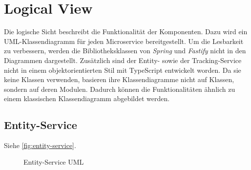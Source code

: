 \section{Logical View}
Die logische Sicht beschreibt die Funktionalität der Komponenten.
Dazu wird ein UML-Klassendiagramm für jeden Microservice bereitgestellt.
Um die Lesbarkeit zu verbessern, werden die Bibliotheksklassen von \textit{Spring} und \textit{Fastify} nicht in den Diagrammen dargestellt.
Zusätzlich sind der Entity- sowie der Tracking-Service nicht in einem objektorientierten Stil mit TypeScript entwickelt worden.
Da sie keine Klassen verwenden, basieren ihre Klassendiagramme nicht auf Klassen, sondern auf deren Modulen.
Dadurch können die Funktionalitäten ähnlich zu einem klassischen Klassendiagramm abgebildet werden.

\subsection{Entity-Service}
Siehe \autoref{fig:entity-service}.
\begin{figure}[h]
    \centering
    \caption{Entity-Service UML}
    \label{fig:entity-service}
\end{figure}

